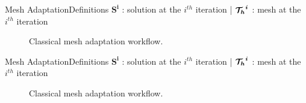 \begin{frame}[noframenumbering]{Mesh Adaptation}{Definitions}
  $\boldsymbol{S^i}$ : solution at the $i^{th}$ iteration |
  $\boldsymbol{{\mathcal{T}_h}^i}$ : mesh at the $i^{th}$ iteration
  \vspace{0.5cm}
   \begin{figure}
        \caption*{Classical mesh adaptation workflow.}
   \end{figure}
\end{frame}


\begin{frame}[noframenumbering]{Mesh Adaptation}{Definitions}
  $\boldsymbol{S^i}$ : solution at the $i^{th}$ iteration |
  $\boldsymbol{{\mathcal{T}_h}^i}$ : mesh at the $i^{th}$ iteration
  \vspace{0.5cm}
   \begin{figure}
        \caption*{Classical mesh adaptation workflow.}
   \end{figure}
\end{frame}


